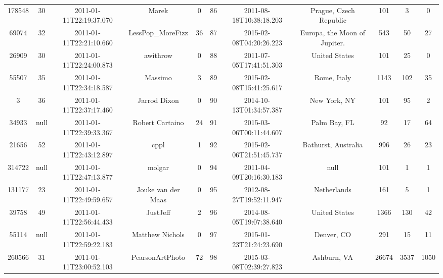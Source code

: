 \documentclass[12pt,a4paper,twoside,openright,titlepage,final]{article}
\begin{document}
\begin{enumerate}
\begin{table}[htbp!]
{\begin{tabular}{@{}ccccccccccc@{}}
			178548    & 30   & 2011-01-11T22:19:37.070 & Marek                 & 0         & 86    & 2011-08-18T10:38:18.203 & Prague, Czech Republic           & 101        & 3       & 0     \\
			69074     & 32   & 2011-01-11T22:21:10.660 & LessPop\_MoreFizz     & 36        & 87    & 2015-02-08T04:20:26.223 & Europa, the Moon of Jupiter.     & 543        & 50      & 27    \\
			26909     & 30   & 2011-01-11T22:24:00.873 & awithrow              & 0         & 88    & 2011-07-05T17:41:51.303 & United States                    & 101        & 25      & 0     \\
			55507     & 35   & 2011-01-11T22:34:18.587 & Massimo               & 3         & 89    & 2015-02-08T15:41:25.617 & Rome, Italy                      & 1143       & 102     & 35    \\
			3         & 36   & 2011-01-11T22:37:17.460 & Jarrod Dixon          & 0         & 90    & 2014-10-13T01:34:57.387 & New York, NY                     & 101        & 95      & 2     \\
			34933     & null & 2011-01-11T22:39:33.367 & Robert Cartaino       & 24        & 91    & 2015-03-06T00:11:44.607 & Palm Bay, FL                     & 92         & 17      & 64    \\
			21656     & 52   & 2011-01-11T22:43:12.897 & cppl                  & 1         & 92    & 2015-02-06T21:51:45.737 & Bathurst, Australia              & 996        & 26      & 23    \\
			314722    & null & 2011-01-11T22:47:13.877 & molgar                & 0         & 94    & 2011-04-09T20:16:30.183 & null                             & 101        & 1       & 1     \\
			131177    & 23   & 2011-01-11T22:49:59.657 & Jouke van der Maas    & 0         & 95    & 2012-08-27T19:52:11.947 & Netherlands                      & 161        & 5       & 1     \\
			39758     & 49   & 2011-01-11T22:56:44.433 & JustJeff              & 2         & 96    & 2014-08-05T19:07:38.640 & United States                    & 1366       & 130     & 42    \\
			55114     & null & 2011-01-11T22:59:22.183 & Matthew Nichols       & 0         & 97    & 2015-01-23T21:24:23.690 & Denver, CO                       & 291        & 15      & 11    \\
			260566    & 31   & 2011-01-11T23:00:52.103 & PearsonArtPhoto       & 72        & 98    & 2015-03-08T02:39:27.823 & Ashburn, VA                      & 26674      & 3537    & 1050  \\

\end{tabular}}
\end{table}
\end{enumerate}
\end{document}
